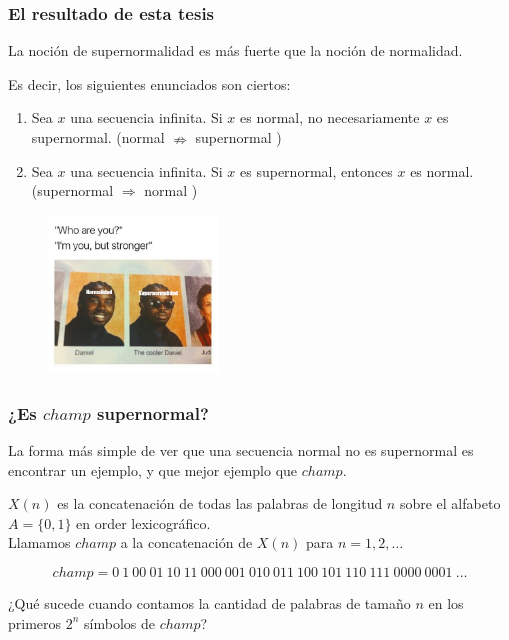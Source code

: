 \documentclass[10pt,mathserif]{beamer}%
\begin{document}
\begin{frame}
  \frametitle{El resultado de esta tesis}
  \pause
  \begin{theorem}
    La noción de supernormalidad es más fuerte que la noción de normalidad.

    Es decir, los siguientes enunciados son ciertos:
    \begin{enumerate}
      \item Sea $x$ una secuencia infinita. Si $x$ es normal, no necesariamente  $x$ es supernormal. (normal $\nRightarrow$ supernormal )
      \item Sea $x$ una secuencia infinita. Si $x$ es supernormal, entonces $x$ es normal. (supernormal $\Rightarrow$ normal )
    \end{enumerate}
  \end{theorem}
  \pause
  \begin{figure}[h]
    \includegraphics[width=0.4\textwidth]{imagenes/meme.png}
    \centering
    \label{fig:meme}
\end{figure}
\end{frame}

\begin{frame}
  \frametitle{¿Es $champ$ supernormal?}
  
  La forma más simple de ver que una secuencia normal no es supernormal es encontrar un ejemplo, y que mejor ejemplo que $champ$.

  \begin{recall}
    $X(n)$ es la concatenación de todas las palabras de longitud $n$ sobre el alfabeto $A=\{0,1\}$ en order lexicográfico.\\
    
    Llamamos $champ$ a la concatenación de  $X(n)$ para $n = 1,2,\dots$

    $$champ = 0 \: 1 \: 00 \: 01 \: 10 \: 11 \: 000 \: 001 \: 010 \: 011 \: 100 \: 101 \: 110 \: 111 \: 0000 \: 0001 \: \dots$$

  \end{recall}

  \pause
  ¿Qué sucede cuando contamos la cantidad de palabras de tamaño $n$ en los primeros $2^n$ símbolos de $champ$?
  
\end{frame}
\end{document}
